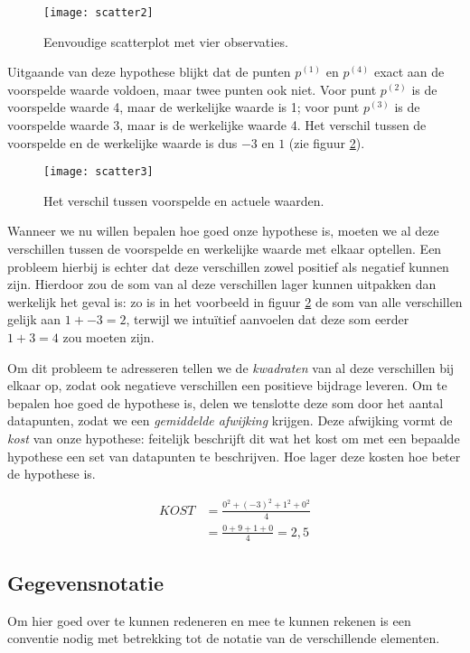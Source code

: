 \begin{figure}[h]
\centering
\texttt{[image: scatter2]}
\caption{Eenvoudige scatterplot met vier observaties.\label{img:scatter2}}
\end{figure}

Uitgaande van deze hypothese blijkt dat de punten $p^{(1)}$ en $p^{(4)}$ exact aan de voorspelde waarde voldoen, maar twee punten ook niet. Voor punt $p^{(2)}$ is de voorspelde waarde 4, maar de werkelijke waarde is 1; voor punt $p^{(3)}$ is de voorspelde waarde 3, maar is de werkelijke waarde 4. Het verschil tussen de voorspelde en de werkelijke waarde is dus $-3$ en $1$ (zie figuur \ref{img:scatter3}).

\begin{figure}[h]
\centering
\texttt{[image: scatter3]}
\caption{Het verschil tussen voorspelde en actuele waarden.\label{img:scatter3}}
\end{figure}

Wanneer we nu willen bepalen hoe goed onze hypothese is, moeten we al deze verschillen tussen de voorspelde en werkelijke waarde met elkaar optellen. Een probleem hierbij is echter dat deze verschillen zowel positief als negatief kunnen zijn. Hierdoor zou de som van al deze verschillen lager kunnen uitpakken dan werkelijk het geval is: zo is in het voorbeeld in figuur \ref{img:scatter3} de som van alle verschillen gelijk aan $1+-3=2$, terwijl we intuïtief aanvoelen dat deze som eerder $1+3=4$ zou moeten zijn.

Om dit probleem te adresseren tellen we de \textit{kwadraten} van al deze verschillen bij elkaar op, zodat ook negatieve verschillen een positieve bijdrage leveren. Om te bepalen hoe goed de hypothese is, delen we tenslotte deze som door het aantal datapunten, zodat we een \textit{gemiddelde afwijking} krijgen. Deze afwijking vormt de \textit{kost} van onze hypothese: feitelijk beschrijft dit wat het kost om met een bepaalde hypothese een set van datapunten te beschrijven. Hoe lager deze kosten hoe beter de hypothese is.

\[
\begin{aligned}
KOST &= \frac{0^2 + (-3)^2 + 1^2 + 0^2}{4}\\
&= \frac{0+9+1+0}{4}=2,5
\end{aligned}
\]


\subsection{Gegevensnotatie}
Om hier goed over te kunnen redeneren en mee te kunnen rekenen is een conventie nodig met betrekking tot de notatie van de verschillende elementen.

